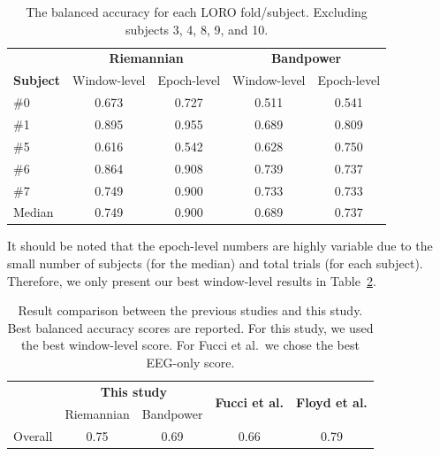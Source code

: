         \begin{table}[h]
            \centering
            \begin{tabular}{lcccc}
                \toprule
                & \multicolumn{2}{c}{\textbf{Riemannian}} & \multicolumn{2}{c}{\textbf{Bandpower}} \\
                \cmidrule(lr){2-3}
                \cmidrule(lr){4-5}
                \textbf{Subject} & Window-level & Epoch-level & Window-level & Epoch-level \\
                \midrule
                \#0 & 0.673 & 0.727 & 0.511 & 0.541 \\
                \#1 & 0.895 & 0.955 & 0.689 & 0.809 \\
                \#5 & 0.616 & 0.542 & 0.628 & 0.750 \\
                \#6 & 0.864 & 0.908 & 0.739 & 0.737 \\
                \#7 & 0.749 & 0.900 & 0.733 & 0.733 \\
                \midrule
                Median & 0.749 & 0.900 & 0.689 & 0.737 \\
                \bottomrule
            \end{tabular}
            \caption{The balanced accuracy for each LORO fold/subject. Excluding subjects 3, 4, 8, 9, and 10.}\label{table:bac-selective}
        \end{table}

        It should be noted that the epoch-level numbers are highly variable due to the small number of subjects (for the median) and total trials (for each subject). Therefore, we only present our best window-level results in Table~\ref{table:compare-results}.

        \begin{table}[h]
            \begin{center}
                \begin{tabular}{lcccc}
                    \toprule
                    & \multicolumn{2}{c}{\textbf{This study}} & \multirow{2}{*}{\textbf{Fucci et al.}} & \multirow{2}{*}{\textbf{Floyd et al.}} \\
                    \cmidrule(lr){2-3}
                    & Riemannian & Bandpower & & \\
                    \midrule
                    Overall & 0.75 & 0.69 & 0.66 & 0.79 \\
                    \bottomrule
                \end{tabular}
                \caption{Result comparison between the previous studies and this study. Best balanced accuracy scores are reported. For this study, we used the best window-level score. For Fucci et al.\ we chose the best EEG-only score.}\label{table:compare-results}
            \end{center}
        \end{table}

